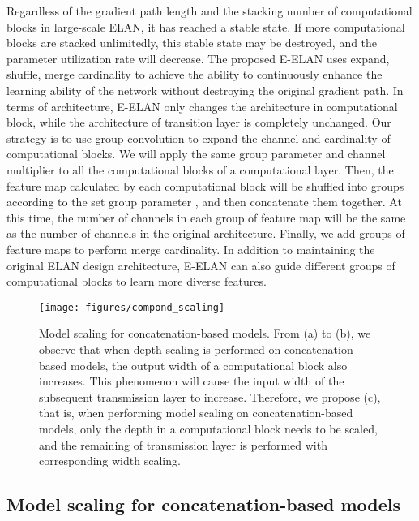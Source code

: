 \documentclass[10pt,twocolumn,letterpaper]{article}
\begin{document}
		Regardless of the gradient path length and the stacking number of computational blocks in large-scale ELAN, it has reached a stable state. If more computational blocks are stacked unlimitedly, this stable state may be destroyed, and the parameter utilization rate will decrease. The proposed E-ELAN uses expand, shuffle, merge cardinality to achieve the ability to continuously enhance the learning ability of the network without destroying the original gradient path. In terms of architecture, E-ELAN only changes the architecture in computational block, while the architecture of transition layer is completely unchanged. Our strategy is to use group convolution to expand the channel and cardinality of computational blocks. We will apply the same group parameter and channel multiplier to all the computational blocks of a computational layer. Then, the feature map calculated by each computational block will be shuffled into  groups according to the set group parameter , and then concatenate them together. At this time, the number of channels in each group of feature map will be the same as the number of channels in the original architecture. Finally, we add  groups of feature maps to perform merge cardinality. In addition to maintaining the original ELAN design architecture, E-ELAN can also guide different groups of computational blocks to learn more diverse features.
		
		\begin{figure*}[t]
			\begin{center}
				\texttt{[image: figures/compond\_scaling]}
			\end{center}
			\caption{Model scaling for concatenation-based models.  From (a) to (b), we observe that when depth scaling is performed on concatenation-based models, the output width of a computational block also increases.  This phenomenon will cause the input width of the subsequent transmission layer to increase.  Therefore, we propose (c), that is, when performing model scaling on concatenation-based models, only the depth in a computational block needs to be scaled, and the remaining of transmission layer is performed with corresponding width scaling.}
			\label{fig:cosc}
			\vspace{-2mm}
		\end{figure*}
		


		\subsection{Model scaling for concatenation-based models}
		
\end{document}
